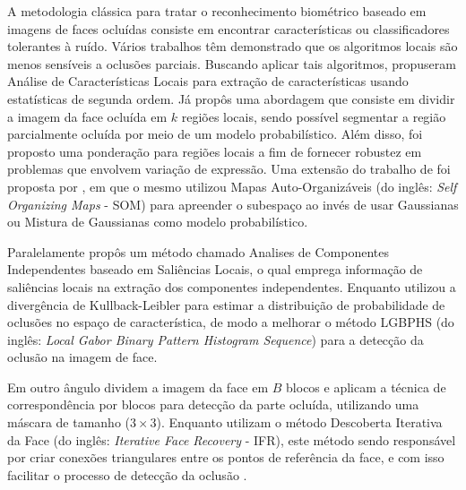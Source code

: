  


A metodologia clássica para tratar o reconhecimento biométrico baseado em imagens de faces ocluídas consiste em encontrar características ou classificadores tolerantes à ruído. Vários trabalhos têm demonstrado que os algoritmos locais são menos sensíveis a oclusões parciais. Buscando aplicar tais algoritmos,  propuseram Análise de Características Locais para extração de características usando estatísticas de segunda ordem. Já  propôs uma abordagem que consiste em dividir  a imagem da face ocluída em $k$ regiões locais, sendo possível segmentar a região parcialmente ocluída por meio de um modelo probabilístico. Além disso, foi proposto uma ponderação para regiões locais a fim de fornecer robustez em problemas que envolvem variação de expressão. Uma extensão do trabalho de  foi proposta por , em que o mesmo utilizou Mapas Auto-Organizáveis (do inglês: \textit{Self Organizing Maps} - SOM) para apreender o subespaço ao invés de usar Gaussianas ou Mistura de Gaussianas como modelo probabilístico.

Paralelamente  propôs um método chamado Analises de Componentes Independentes baseado em Saliências Locais, o qual emprega  informação de saliências locais na extração dos componentes independentes. Enquanto  utilizou a divergência de Kullback-Leibler  para estimar a distribuição de probabilidade de oclusões no espaço de característica, de modo a melhorar o método LGBPHS (do inglês: \textit{Local Gabor Binary Pattern Histogram Sequence}) para a detecção da oclusão na imagem de face.



Em outro ângulo  dividem a imagem da face em $B$ blocos e aplicam a técnica de correspondência por blocos para detecção da parte ocluída, utilizando uma máscara de tamanho ($3 \times 3$).  Enquanto   utilizam o método Descoberta Iterativa da Face (do inglês: \textit{Iterative Face Recovery} - IFR), este método sendo responsável por criar conexões triangulares entre os pontos de referência da face, e com isso facilitar o processo de detecção da oclusão .




